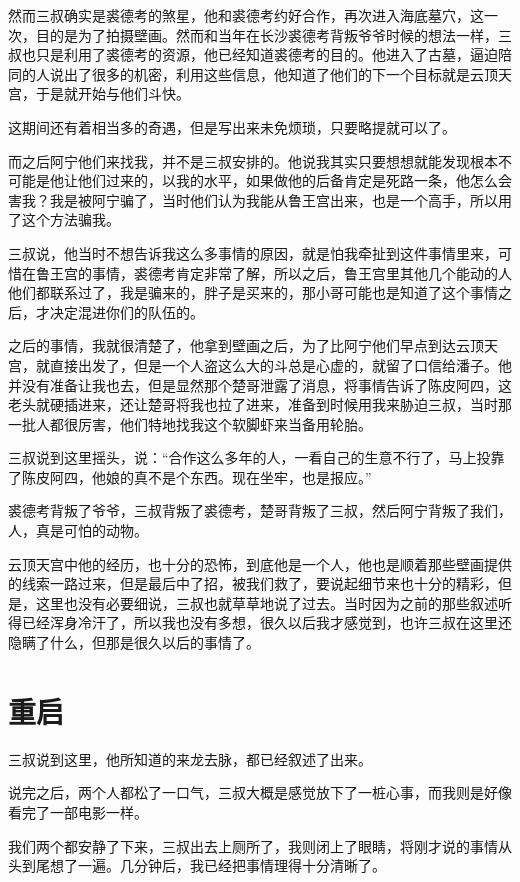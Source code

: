 然而三叔确实是裘德考的煞星，他和裘德考约好合作，再次进入海底墓穴，这一次，目的是为了拍摄壁画。然而和当年在长沙裘德考背叛爷爷时候的想法一样，三叔也只是利用了裘德考的资源，他已经知道裘德考的目的。他进入了古墓，逼迫陪同的人说出了很多的机密，利用这些信息，他知道了他们的下一个目标就是云顶天宫，于是就开始与他们斗快。

这期间还有着相当多的奇遇，但是写出来未免烦琐，只要略提就可以了。

而之后阿宁他们来找我，并不是三叔安排的。他说我其实只要想想就能发现根本不可能是他让他们过来的，以我的水平，如果做他的后备肯定是死路一条，他怎么会害我？我是被阿宁骗了，当时他们认为我能从鲁王宫出来，也是一个高手，所以用了这个方法骗我。

三叔说，他当时不想告诉我这么多事情的原因，就是怕我牵扯到这件事情里来，可惜在鲁王宫的事情，裘德考肯定非常了解，所以之后，鲁王宫里其他几个能动的人他们都联系过了，我是骗来的，胖子是买来的，那小哥可能也是知道了这个事情之后，才决定混进你们的队伍的。

之后的事情，我就很清楚了，他拿到壁画之后，为了比阿宁他们早点到达云顶天宫，就直接出发了，但是一个人盗这么大的斗总是心虚的，就留了口信给潘子。他并没有准备让我也去，但是显然那个楚哥泄露了消息，将事情告诉了陈皮阿四，这老头就硬插进来，还让楚哥将我也拉了进来，准备到时候用我来胁迫三叔，当时那一批人都很厉害，他们特地找我这个软脚虾来当备用轮胎。

三叔说到这里摇头，说：“合作这么多年的人，一看自己的生意不行了，马上投靠了陈皮阿四，他娘的真不是个东西。现在坐牢，也是报应。”

裘德考背叛了爷爷，三叔背叛了裘德考，楚哥背叛了三叔，然后阿宁背叛了我们，人，真是可怕的动物。

云顶天宫中他的经历，也十分的恐怖，到底他是一个人，他也是顺着那些壁画提供的线索一路过来，但是最后中了招，被我们救了，要说起细节来也十分的精彩，但是，这里也没有必要细说，三叔也就草草地说了过去。当时因为之前的那些叙述听得已经浑身冷汗了，所以我也没有多想，很久以后我才感觉到，也许三叔在这里还隐瞒了什么，但那是很久以后的事情了。

\chapter{重启}

三叔说到这里，他所知道的来龙去脉，都已经叙述了出来。

说完之后，两个人都松了一口气，三叔大概是感觉放下了一桩心事，而我则是好像看完了一部电影一样。

我们两个都安静了下来，三叔出去上厕所了，我则闭上了眼睛，将刚才说的事情从头到尾想了一遍。几分钟后，我已经把事情理得十分清晰了。

